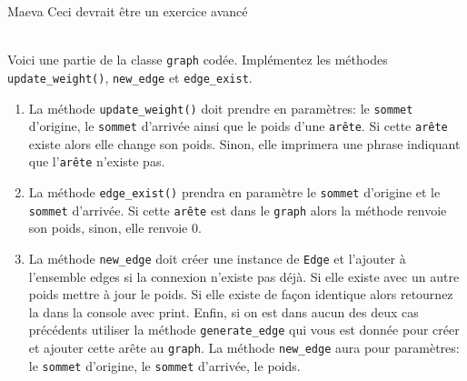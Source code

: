 \begin{note}{Maeva}
    Ceci devrait être un exercice avancé
\end{note}
\begin{Exercice}[20 minutes]\\

Voici une partie de la classe \lstinline{graph} codée. Implémentez les méthodes \lstinline{update_weight()}, \lstinline{new_edge} et \lstinline{edge_exist}.

         
    \begin{enumerate}
        \item La méthode \lstinline{update_weight()} doit prendre en paramètres: le \lstinline{sommet} d'origine, le \lstinline{sommet} d'arrivée ainsi que le poids d'une \lstinline{arête}. Si cette \lstinline{arête} existe alors elle change son poids. Sinon, elle imprimera une phrase indiquant que l'\lstinline{arête} n'existe pas.
        \item La méthode \lstinline{edge_exist()} prendra en paramètre le \lstinline{sommet} d'origine et le \lstinline{sommet} d'arrivée. Si cette \lstinline{arête} est dans le \lstinline{graph} alors la méthode renvoie son poids, sinon, elle renvoie 0.
        \item La méthode \lstinline{new_edge} doit créer une instance de \lstinline{Edge} et l'ajouter à l'ensemble edges si la connexion n'existe pas déjà. Si elle existe avec un autre poids mettre à jour le poids. Si elle existe de façon identique alors retournez la dans la console avec print. Enfin, si on est dans aucun des deux cas précédents utiliser la méthode \lstinline{generate_edge} qui vous est donnée pour créer et ajouter cette arête au \lstinline{graph}. La méthode \lstinline{new_edge} aura pour paramètres: le \lstinline{sommet} d'origine, le \lstinline{sommet} d'arrivée, le poids.
    \end{enumerate}


\end{Exercice}
